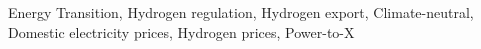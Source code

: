 \documentclass[5p,numafflabel]{elsarticle}
\newcommand{\co}{\ce{CO2}~}
\def\co{CO${}_2${\:}}
\begin{document}
\begin{frontmatter}
\begin{abstract}
	\end{abstract}

	\begin{keyword}
		Energy Transition, Hydrogen regulation, Hydrogen export, Climate-neutral, Domestic electricity prices, Hydrogen prices, Power-to-X
	\end{keyword}




\end{frontmatter}







% 
\end{document}
